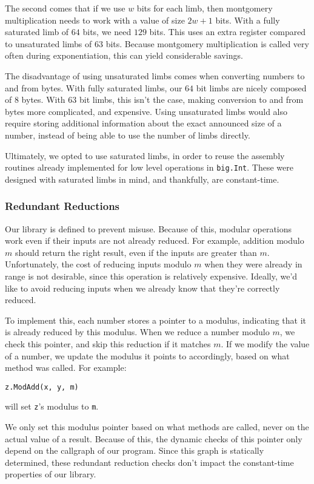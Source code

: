 \documentclass[11pt, a4paper]{article} %
\begin{document}
{The second comes that if we use $w$ bits for each limb, then montgomery
multiplication needs to work with a value of size $2w + 1$ bits. With a fully
saturated limb of $64$ bits, we need $129$ bits. This uses
an extra register compared to unsaturated limbs of $63$ bits. Because
montgomery multiplication is called very often during exponentiation,
this can yield considerable savings.

The disadvantage of using unsaturated limbs comes when converting
numbers to and from bytes. With fully saturated limbs, our
$64$ bit limbs are nicely composed of $8$ bytes. With $63$ bit limbs,
this isn't the case, making conversion to and from bytes more
complicated, and expensive. Using unsaturated limbs would
also require storing additional information about the exact
announced size of a number, instead of being able to use
the number of limbs directly.

Ultimately, we opted to use saturated limbs, in order to reuse
the assembly routines already implemented for low level
operations in \texttt{big.Int}. These were designed with
saturated limbs in mind, and thankfully, are constant-time.

\subsubsection{Redundant Reductions}

Our library is defined to prevent misuse. Because of this,
modular operations work even if their inputs are not already
reduced. For example, addition modulo $m$ should return the
right result, even if the inputs are greater than $m$.
Unfortunately, the cost of reducing inputs modulo $m$ when
they were already in range is not desirable, since this operation
is relatively expensive. Ideally, we'd like to avoid reducing
inputs when we already know that they're correctly reduced.

To implement this, each number stores a pointer to a modulus,
indicating that it is already reduced by this modulus.
When we reduce a number modulo $m$, we check this pointer,
and skip this reduction if it matches $m$. If we modify
the value of a number, we update the modulus it points to
accordingly, based on what method was called.
For example:
\begin{verbatim}
z.ModAdd(x, y, m)
\end{verbatim}
will set \texttt{z}'s modulus to \texttt{m}.

We only set this modulus pointer based on what methods are called,
never on the actual value of a result. Because of this, the dynamic
checks of this pointer only depend on the callgraph of our program.
Since this graph is statically determined, these redundant reduction
checks don't impact the constant-time properties of our library.

}
\end{document}
